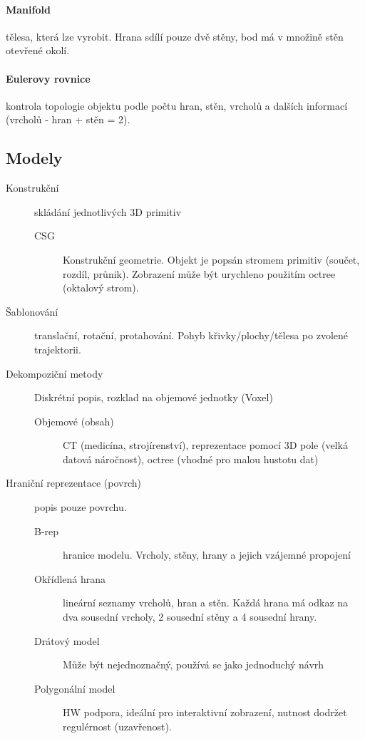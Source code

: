 \documentclass[a4paper, 11pt]{report}
\begin{document}
\paragraph{Manifold} tělesa, která lze vyrobit. Hrana sdílí pouze dvě stěny, bod má v množině stěn otevřené okolí.

\paragraph{Eulerovy rovnice} kontrola topologie objektu podle počtu hran, stěn, vrcholů a dalších informací (vrcholů - hran + stěn = 2).

\subsection{Modely}
\begin{description}
	\item[Konstrukční] skládání jednotlivých 3D primitiv
	\begin{description}
		\item[CSG] Konstrukční geometrie. Objekt je popsán stromem primitiv (součet, rozdíl, průnik). Zobrazení může být urychleno použitím octree (oktalový strom).
	\end{description}
	\item[Šablonování] translační, rotační, protahování. Pohyb křivky/plochy/tělesa po zvolené trajektorii.
	\item[Dekompoziční metody] Diskrétní popis, rozklad na objemové jednotky (Voxel)
	\begin{description}
		\item[Objemové (obsah)] CT (medicína, strojírenství), reprezentace pomocí 3D pole (velká datová náročnost), octree (vhodné pro malou hustotu dat)
	\end{description}
	\item[Hraniční reprezentace (povrch)] popis pouze povrchu.
	\begin{description}
		\item[B-rep] hranice modelu. Vrcholy, stěny, hrany a jejich vzájemné propojení
		\item[Okřídlená hrana]lineární seznamy vrcholů, hran a stěn. Každá hrana má odkaz na dva sousední vrcholy, 2 sousední stěny a 4 sousední hrany.
		\item[Drátový model] Může být nejednoznačný, používá se jako jednoduchý návrh
		\item[Polygonální model] HW podpora, ideální pro interaktivní zobrazení, nutnost dodržet regulérnost (uzavřenost).

\end{description}
\end{description}
\end{document}
